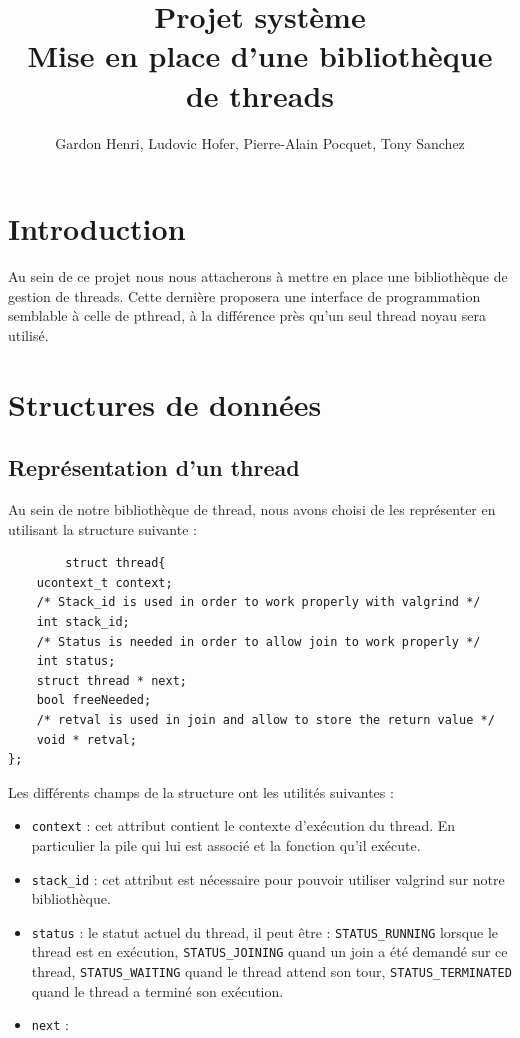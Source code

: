 \documentclass{article}
\title{Projet système \\ Mise en place d'une bibliothèque de threads}
\author{Gardon Henri, Ludovic Hofer, Pierre-Alain Pocquet, Tony
  Sanchez}
\begin{document}
	\maketitle
	\newpage
	\tableofcontents
	\newpage

	\section{Introduction}
	
	Au sein de ce projet nous nous attacherons à mettre en place une
    bibliothèque de gestion de threads. Cette dernière proposera une
    interface de programmation semblable à celle de pthread, à la
    différence près qu'un seul thread noyau sera utilisé.

	\section{Structures de données}

		\subsection{Représentation d'un thread}
		Au sein de notre bibliothèque de thread, nous avons choisi de les
		représenter en utilisant la structure suivante : \\
		\begin{verbatim}
		struct thread{
    ucontext_t context;
    /* Stack_id is used in order to work properly with valgrind */
    int stack_id;
    /* Status is needed in order to allow join to work properly */
    int status;
    struct thread * next;
    bool freeNeeded;
    /* retval is used in join and allow to store the return value */
    void * retval;
};
	\end{verbatim}
		Les différents champs de la structure ont les utilités 
		suivantes :
		\begin{itemize}
			\item \verb!context! : cet attribut contient le contexte
			d'exécution du thread. En particulier la pile qui lui est
			associé et la fonction qu'il exécute.
			\item \verb!stack_id! : cet attribut est nécessaire pour
			pouvoir utiliser valgrind sur notre bibliothèque.
			\item \verb!status! : le statut actuel du thread, il peut
			être : \verb!STATUS_RUNNING! lorsque le thread est en 
			exécution, \verb!STATUS_JOINING! quand un join a été 
			demandé sur ce thread, \verb!STATUS_WAITING! quand le 
			thread attend son tour, \verb!STATUS_TERMINATED! quand 
			le thread a terminé son exécution.
			\item \verb!next! : %
			
		\end{itemize}		
		
\end{document}
